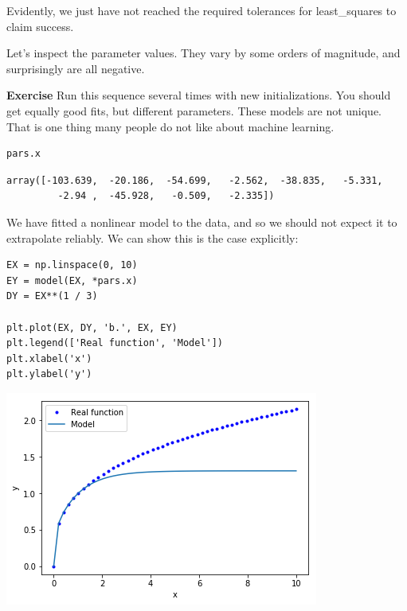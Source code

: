 \documentclass[11pt]{article}
\begin{document}
Evidently, we just have not reached the required tolerances for least\_squares to claim success.

Let's inspect the parameter values. They vary by some orders of magnitude, and surprisingly are all negative.

\textbf{Exercise} Run this sequence several times with new initializations. You should get equally good fits, but different parameters. These models are not unique. That is one thing many people do not like about machine learning.

\begin{verbatim}
pars.x
\end{verbatim}

\begin{verbatim}
array([-103.639,  -20.186,  -54.699,   -2.562,  -38.835,   -5.331,
         -2.94 ,  -45.928,   -0.509,   -2.335])
\end{verbatim}


We have fitted a nonlinear model to the data, and so we should not expect it to extrapolate reliably. We can show this is the case explicitly:

\begin{verbatim}
EX = np.linspace(0, 10)
EY = model(EX, *pars.x)
DY = EX**(1 / 3)

plt.plot(EX, DY, 'b.', EX, EY)
plt.legend(['Real function', 'Model'])
plt.xlabel('x')
plt.ylabel('y')
\end{verbatim}

\begin{center}
\includegraphics[width=.9\linewidth]{obipy-resources/de048b6a9afb1b9e2b48e7a057512e1e-70304sta.png}
\end{center}
\end{document}
